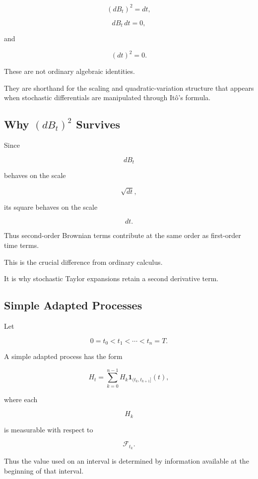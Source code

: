 \[
\boxed{
(dB_t)^2=dt,
}
\]

\[
\boxed{
dB_t\,dt=0,
}
\]

and

\[
\boxed{
(dt)^2=0.
}
\]

These are not ordinary algebraic identities.

They are shorthand for the scaling and quadratic-variation structure
that appears when stochastic differentials are manipulated through
It\^o's formula.

\subsection{Why \((dB_t)^2\) Survives}
\label{subsec:why-db-square-survives}

Since

\[
dB_t
\]

behaves on the scale

\[
\sqrt{dt},
\]

its square behaves on the scale

\[
dt.
\]

Thus second-order Brownian terms contribute at the same order as
first-order time terms.

This is the crucial difference from ordinary calculus.

It is why stochastic Taylor expansions retain a second derivative term.

\subsection{Simple Adapted Processes}
\label{subsec:simple-adapted-processes}

Let

\[
0=t_0<t_1<\cdots<t_n=T.
\]

A simple adapted process has the form

\[
\boxed{
H_t
=
\sum_{k=0}^{n-1}
H_k
\mathbf{1}_{(t_k,t_{k+1}]}(t),
}
\]

where each

\[
H_k
\]

is measurable with respect to

\[
\mathcal{F}_{t_k}.
\]

Thus the value used on an interval is determined by information
available at the beginning of that interval.

